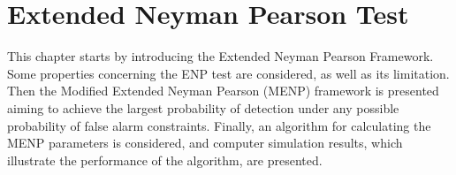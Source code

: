 \chapter{Extended Neyman Pearson Test}

\newcommand{\bom}{\boldsymbol{\omega}}
This chapter starts by introducing the Extended Neyman Pearson Framework. Some properties concerning the ENP test are considered, as well as its limitation. Then the Modified Extended Neyman Pearson (MENP) framework is presented aiming to achieve the largest probability of detection under any possible probability of false alarm constraints. Finally, an algorithm for calculating the MENP parameters is considered, and  computer simulation results, which illustrate the performance of the algorithm, are presented. 

\typeout{}


\typeout{}


\typeout{}


\typeout{}


\typeout{}

                     
